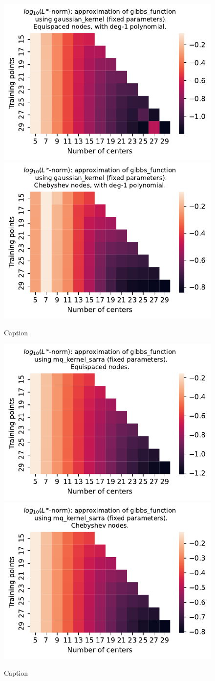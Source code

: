 \documentclass[12pt]{report} %
\begin{document}
\begin{figure}[ht]
    \centering
    
    \includegraphics[width=.49\textwidth]{imagenes/experiments/1d/least_squares/opt-gibbs_function-Kgaussian_kernel-Poly-Equi.pdf}
    \includegraphics[width=.49\textwidth]{imagenes/experiments/1d/least_squares/opt-gibbs_function-Kgaussian_kernel-Poly-Cheb.pdf}
    \caption{Caption}
    \label{fig:opt-gibbs-gaussian-poly}
\end{figure}

\begin{figure}[ht]
    \centering
    
    \includegraphics[width=.49\textwidth]{imagenes/experiments/1d/least_squares/opt-gibbs_function-Kmq_kernel_sarra-Equi.pdf}
    \includegraphics[width=.49\textwidth]{imagenes/experiments/1d/least_squares/opt-gibbs_function-Kmq_kernel_sarra-Cheb.pdf}
    \caption{Caption}
    \label{fig:opt-gibbs-sarra}
\end{figure}
\end{document}
